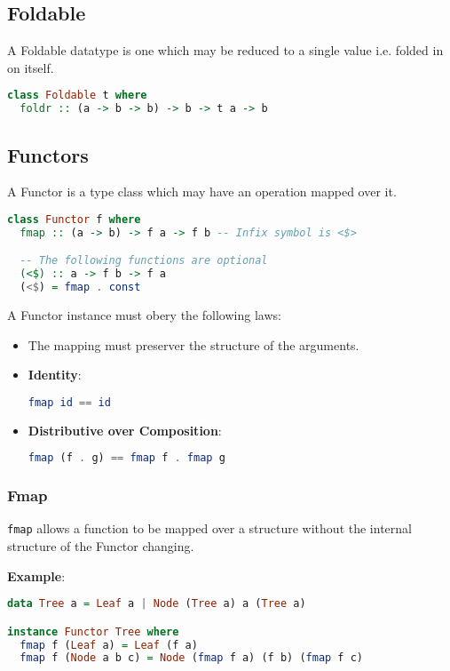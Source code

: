 \subsection{Foldable}
A Foldable datatype is one which may be reduced to a single value i.e. folded in on itself.
\begin{lstlisting}[language=haskell]
class Foldable t where
  foldr :: (a -> b -> b) -> b -> t a -> b
\end{lstlisting}

\subsection{Functors}
A Functor is a type class which may have an operation mapped over it.

\begin{lstlisting}[language=haskell]
class Functor f where
  fmap :: (a -> b) -> f a -> f b -- Infix symbol is <$>

  -- The following functions are optional
  (<$) :: a -> f b -> f a
  (<$) = fmap . const
\end{lstlisting}

A Functor instance must obery the following laws:
\begin{itemize}
  \item The mapping must preserver the structure of the arguments.
  \item \textbf{Identity}: \begin{lstlisting}[language=haskell]
fmap id == id\end{lstlisting}
  \item \textbf{Distributive over Composition}: \begin{lstlisting}[language=haskell]
fmap (f . g) == fmap f . fmap g\end{lstlisting}
\end{itemize}

\subsubsection{Fmap}
\texttt{fmap} allows a function to be mapped over a structure without the internal structure of the Functor changing.

\textbf{Example}:
\begin{lstlisting}[language=haskell]
data Tree a = Leaf a | Node (Tree a) a (Tree a)

instance Functor Tree where
  fmap f (Leaf a) = Leaf (f a)
  fmap f (Node a b c) = Node (fmap f a) (f b) (fmap f c)
\end{lstlisting}

